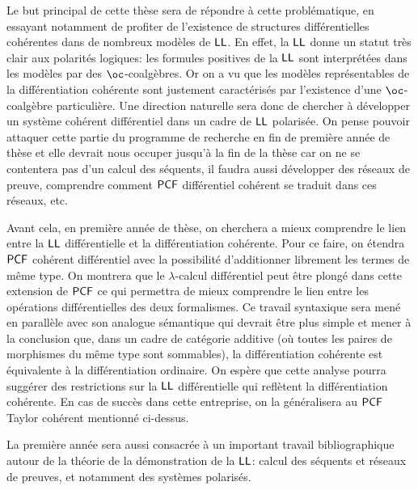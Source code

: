 \documentclass[a4]{article}
\begin{document}
Le but principal de cette thèse sera de répondre à cette
problématique, en essayant notamment de profiter de l'existence de
structures différentielles cohérentes dans de nombreux modèles de
$\hbox{\textsf{LL}}$.
%
En effet, la $\hbox{\textsf{LL}}$ donne un statut très clair aux polarités logiques:
les formules positives de la $\hbox{\textsf{LL}}$ sont interprétées dans les modèles
par des $\oc$-coalgèbres.
%
Or on a vu que les modèles représentables de la différentiation
cohérente sont justement caractérisés par l'existence d'une
$\oc$-coalgèbre particulière.
%
Une direction naturelle sera donc de chercher à développer un système
cohérent différentiel dans un cadre de $\hbox{\textsf{LL}}$ polarisée.
%
On pense pouvoir attaquer cette partie du programme de recherche en
fin de première année de thèse et elle devrait nous occuper jusqu'à la
fin de la thèse car on ne se contentera pas d'un calcul des séquents,
il faudra aussi développer des réseaux de preuve, comprendre comment
$\mathsf{PCF}$ différentiel cohérent se traduit dans ces réseaux, etc.

Avant cela, en première année de thèse, on cherchera a mieux
comprendre le lien entre la $\hbox{\textsf{LL}}$ différentielle et la différentiation
cohérente.
%
Pour ce faire, on étendra $\mathsf{PCF}$ cohérent différentiel avec la
possibilité d'additionner librement les termes de même type.
%
On montrera que le $\lambda$-calcul différentiel peut être plongé dans
cette extension de $\mathsf{PCF}$ ce qui permettra de mieux comprendre le lien
entre les opérations différentielles des deux formalismes.
%
Ce travail syntaxique sera mené en parallèle avec son analogue
sémantique qui devrait être plus simple et mener à la conclusion que,
dans un cadre de catégorie additive (où toutes les paires de
morphismes du même type sont sommables), la différentiation cohérente
est équivalente à la différentiation ordinaire.
%
On espère que cette analyse pourra suggérer des restrictions sur la
$\hbox{\textsf{LL}}$ différentielle qui reflètent la différentiation cohérente.
%
En cas de succès dans cette entreprise, on la généralisera au $\mathsf{PCF}$
Taylor cohérent mentionné ci-dessus.

La première année sera aussi consacrée à un important travail
bibliographique autour de la théorie de la démonstration de la $\hbox{\textsf{LL}}$:
calcul des séquents et réseaux de preuves, et notamment des systèmes
polarisés. 

\end{document}
